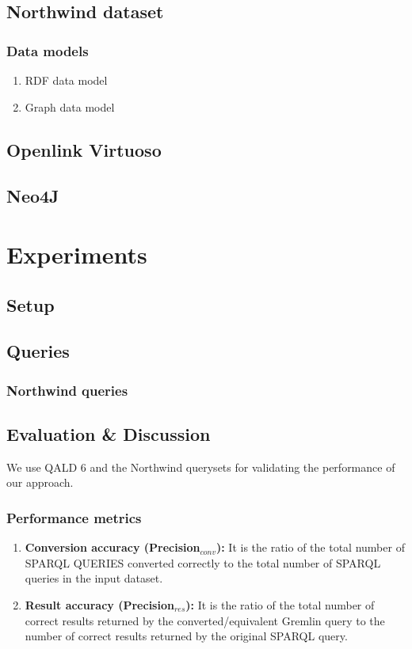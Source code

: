\documentclass{sig-alternate-05-2015}
\begin{document}
\subsection{Northwind dataset}
\subsubsection{Data models}
\begin{enumerate}
    \item RDF data model
    \item Graph data model
\end{enumerate}
\subsection{Openlink Virtuoso}
\subsection{Neo4J}



\section{Experiments}
\subsection{Setup}
\subsection{Queries}
\subsubsection{Northwind queries}


\subsection{Evaluation \& Discussion}
We use QALD 6 and the Northwind querysets for validating the performance of our approach.
\subsubsection{Performance metrics}
\begin{enumerate}
    \item \textbf{Conversion accuracy (Precision$_{conv}$):} It is the ratio of the total number of SPARQL QUERIES converted correctly to the total number of SPARQL queries in the input dataset.
    \item \textbf{Result accuracy (Precision$_{res}$):} It is the ratio of the total number of correct results returned by the converted/equivalent Gremlin query to the number of correct results returned by the original SPARQL query.
\end{enumerate}
\end{document}
